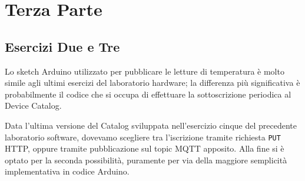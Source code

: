 \documentclass[12pt,a4paper]{article}
\begin{document}
\section{Terza Parte}

\subsection{Esercizi Due e Tre}

Lo sketch Arduino utilizzato per pubblicare le letture di temperatura è molto simile agli ultimi esercizi del laboratorio hardware; la differenza più significativa è probabilmente il codice che si occupa di effettuare la sottoscrizione periodica al Device Catalog.

Data l'ultima versione del Catalog sviluppata nell'esercizio cinque del precedente laboratorio software, dovevamo scegliere tra l'iscrizione tramite richiesta \verb|PUT| HTTP, oppure tramite pubblicazione sul topic MQTT apposito. Alla fine si è optato per la seconda possibilità, puramente per via della maggiore semplicità implementativa in codice Arduino.
\end{document}
